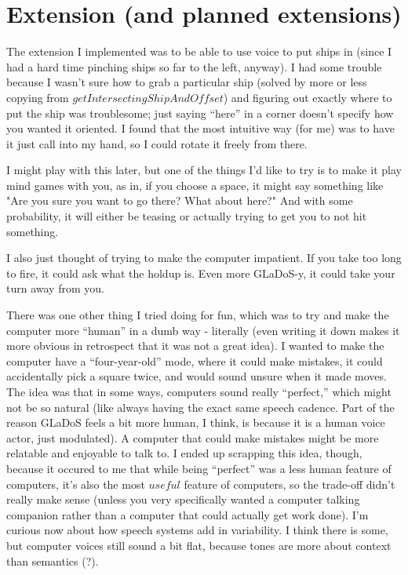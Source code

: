 \documentclass[12pt]{article}
\begin{document}
\section*{Extension (and planned extensions)}
The extension I implemented was to be able to use voice to put ships in (since I had a hard time pinching ships so far to the left, anyway). I had some trouble because I wasn't sure how to grab a particular ship (solved by more or less copying from $getIntersectingShipAndOffset$) and figuring out exactly where to put the ship was troublesome; just saying ``here'' in a corner doesn't specify how you wanted it oriented. I found that the most intuitive way (for me) was to have it just call into my hand, so I could rotate it freely from there.
\par I might play with this later, but one of the things I'd like to try is to make it play mind games with you, as in, if you choose a space, it might say something like "Are you sure you want to go there? What about here?" And with some probability, it will either be teasing or actually trying to get you to not hit something.
\par I also just thought of trying to make the computer impatient. If you take too long to fire, it could ask what the holdup is. Even more GLaDoS-y, it could take your turn away from you.
\par There was one other thing I tried doing for fun, which was to try and make the computer more ``human'' in a dumb way - literally (even writing it down makes it more obvious in retrospect that it was not a great idea). I wanted to make the computer have a ``four-year-old'' mode, where it could make mistakes, it could accidentally pick a square twice, and would sound unsure when it made moves. The idea was that in some ways, computers sound really ``perfect,'' which might not be so natural (like always having the exact same speech cadence. Part of the reason GLaDoS feels a bit more human, I think, is because it is a human voice actor, just modulated). A computer that could make mistakes might be more relatable and enjoyable to talk to. I ended up scrapping this idea, though, because it occured to me that while being ``perfect'' was a less human feature of computers, it's also the most $useful$ feature of computers, so the trade-off didn't really make sense (unless you very specifically wanted a computer talking companion rather than a computer that could actually get work done). I'm curious now about how speech systems add in variability. I think there is some, but computer voices still sound a bit flat, because tones are more about context than semantics (?).
\end{document}
